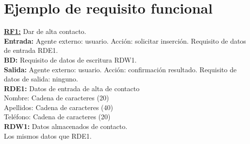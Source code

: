 \section{Ejemplo de requisito funcional}
\textbf{\textcolor{rojo}{\underline{RF1:}}} Dar de alta contacto. \\[6pt]

\textbf{\textcolor{rojo}{Entrada:}} Agente externo: usuario. Acción: solicitar inserción. 
Requisito de datos de entrada \textcolor{azul}{RDE1}. \\[6pt]

\textbf{\textcolor{rojo}{BD:}} Requisito de datos de escritura \textcolor{azul}{RDW1}. \\[6pt]

\textbf{\textcolor{rojo}{Salida:}} Agente externo: usuario. Acción: confirmación resultado. 
Requisito de datos de salida: ninguno. \\[12pt]

\textcolor{azul}{\textbf{RDE1:}} Datos de entrada de alta de contacto \\
\hspace*{1cm} Nombre: Cadena de caracteres (20) \\
\hspace*{1cm} Apellidos: Cadena de caracteres (40) \\
\hspace*{1cm} Teléfono: Cadena de caracteres (20) \\[12pt]

\textcolor{azul}{\textbf{RDW1:}} Datos almacenados de contacto. \\
\hspace*{1cm} Los mismos datos que RDE1.
